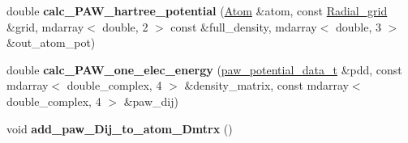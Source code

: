 \begin{DoxyCompactItemize}
\item 
\hypertarget{classsirius_1_1_potential_ab290caf9c8ed3816f869d71efec279d3}{}double {\bfseries calc\+\_\+\+P\+A\+W\+\_\+hartree\+\_\+potential} (\hyperlink{classsirius_1_1_atom}{Atom} \&atom, const \hyperlink{classsirius_1_1_radial__grid}{Radial\+\_\+grid} \&grid, mdarray$<$ double, 2 $>$ const \&full\+\_\+density, mdarray$<$ double, 3 $>$ \&out\+\_\+atom\+\_\+pot)\label{classsirius_1_1_potential_ab290caf9c8ed3816f869d71efec279d3}

\item 
\hypertarget{classsirius_1_1_potential_a04c326ca240c84f7728375646da16e94}{}double {\bfseries calc\+\_\+\+P\+A\+W\+\_\+one\+\_\+elec\+\_\+energy} (\hyperlink{structsirius_1_1_potential_1_1paw__potential__data__t}{paw\+\_\+potential\+\_\+data\+\_\+t} \&pdd, const mdarray$<$ double\+\_\+complex, 4 $>$ \&density\+\_\+matrix, const mdarray$<$ double\+\_\+complex, 4 $>$ \&paw\+\_\+dij)\label{classsirius_1_1_potential_a04c326ca240c84f7728375646da16e94}

\item 
\hypertarget{classsirius_1_1_potential_af3bc1de5a8c117611d0dc0e7dba408a9}{}void {\bfseries add\+\_\+paw\+\_\+\+Dij\+\_\+to\+\_\+atom\+\_\+\+Dmtrx} ()\label{classsirius_1_1_potential_af3bc1de5a8c117611d0dc0e7dba408a9}


\end{DoxyCompactItemize}
